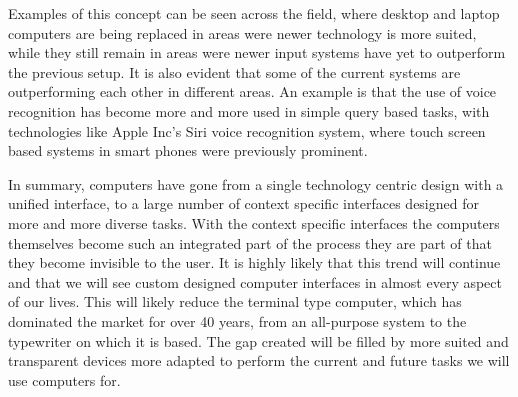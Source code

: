 Examples of this concept can be seen across the field, where desktop and laptop computers are being replaced in areas were newer technology is more suited, while they still remain in areas were newer input systems have yet to outperform the previous setup. It is also evident that some of the current systems are outperforming each other in different areas. An example is that the use of voice recognition has become more and more used in simple query based tasks, with technologies like Apple Inc's Siri voice recognition system, where touch screen based systems in smart phones were previously prominent.

In summary, computers have gone from a single technology centric design with a unified interface, to a large number of context specific interfaces designed for more and more diverse tasks. With the context specific interfaces the computers themselves become such an integrated part of the process they are part of that they become invisible to the user. It is highly likely that this trend will continue and that we will see custom designed computer interfaces in almost every aspect of our lives. This will likely reduce the terminal type computer, which has dominated the market for over 40 years, from an all-purpose system to the typewriter on which it is based. The gap created will be filled by more suited and transparent devices more adapted to perform the current and future tasks we will use computers for.